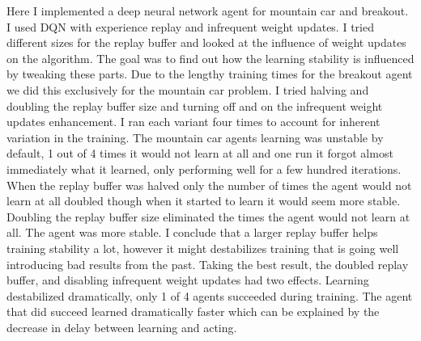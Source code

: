 
Here I implemented a deep neural network agent for mountain car and breakout. I used DQN with experience replay and infrequent weight updates. I tried different sizes for the replay buffer and looked at the influence of weight updates on the algorithm. %
%
The goal was to find out how the learning stability is influenced by tweaking these parts. Due to the lengthy training times for the breakout agent we did this exclusively for the mountain car problem. I tried halving and doubling the replay buffer size and turning off and on the infrequent weight updates enhancement. I ran each variant four times to account for inherent variation in the training.
%
The mountain car agents learning was unstable by default, 1 out of 4 times it would not learn at all and one run it forgot almost immediately what it learned, only performing well for a few hundred iterations. When the replay buffer was halved only the number of times the agent would not learn at all doubled though when it started to learn it would seem more stable. Doubling the replay buffer size eliminated the times the agent would not learn at all. The agent was more stable. I conclude that a larger replay buffer helps training stability a lot, however it might destabilizes training that is going well introducing bad results from the past. Taking the best result, the doubled replay buffer, and disabling infrequent weight updates had two effects. Learning destabilized dramatically, only 1 of 4 agents succeeded during training. The agent that did succeed learned dramatically faster which can be explained by the decrease in delay between learning and acting.

